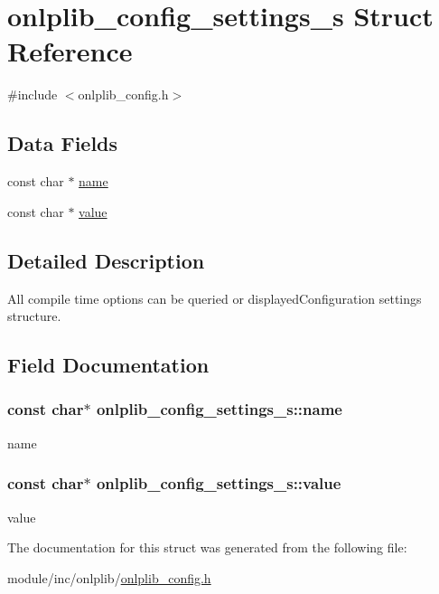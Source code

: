 \hypertarget{structonlplib__config__settings__s}{\section{onlplib\+\_\+config\+\_\+settings\+\_\+s Struct Reference}
\label{structonlplib__config__settings__s}
}


{\ttfamily \#include $<$onlplib\+\_\+config.\+h$>$}

\subsection*{Data Fields}
\begin{DoxyCompactItemize}
\item 
const char $\ast$ \hyperlink{structonlplib__config__settings__s_a93d785725174e62bf8c5463037756c8e}{name}
\item 
const char $\ast$ \hyperlink{structonlplib__config__settings__s_af36227c679615d9a3e6d90abb5de9dd6}{value}
\end{DoxyCompactItemize}


\subsection{Detailed Description}
All compile time options can be queried or displayed\+Configuration settings structure. 

\subsection{Field Documentation}
\hypertarget{structonlplib__config__settings__s_a93d785725174e62bf8c5463037756c8e}{
\subsubsection[{name}]{\setlength{\rightskip}{0pt plus 5cm}const char$\ast$ onlplib\+\_\+config\+\_\+settings\+\_\+s\+::name}}\label{structonlplib__config__settings__s_a93d785725174e62bf8c5463037756c8e}
name \hypertarget{structonlplib__config__settings__s_af36227c679615d9a3e6d90abb5de9dd6}{
\subsubsection[{value}]{\setlength{\rightskip}{0pt plus 5cm}const char$\ast$ onlplib\+\_\+config\+\_\+settings\+\_\+s\+::value}}\label{structonlplib__config__settings__s_af36227c679615d9a3e6d90abb5de9dd6}
value 

The documentation for this struct was generated from the following file\+:\begin{DoxyCompactItemize}
\item 
module/inc/onlplib/\hyperlink{onlplib__config_8h}{onlplib\+\_\+config.\+h}\end{DoxyCompactItemize}
